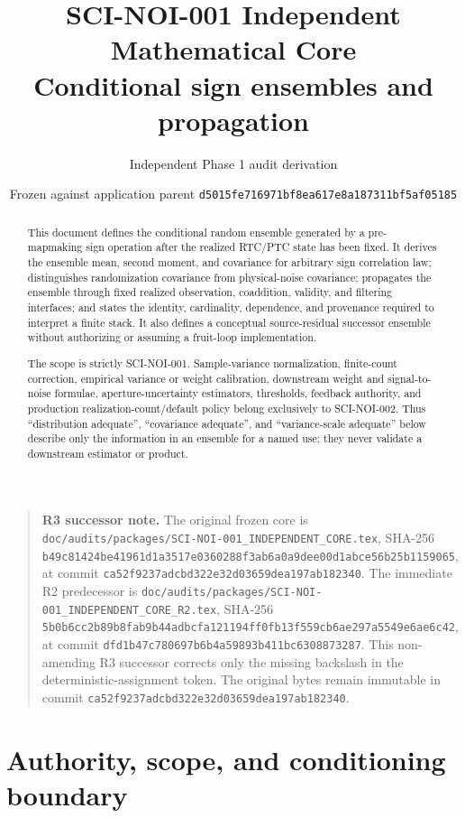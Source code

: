 \documentclass[11pt]{article}
\title{SCI-NOI-001 Independent Mathematical Core\\
Conditional sign ensembles and propagation}
\author{Independent Phase 1 audit derivation}
\date{Frozen against application parent
\texttt{d5015fe716971bf8ea617e8a187311bf5af05185}}
\begin{document}
\maketitle

\begin{quote}
\small
\textbf{R3 successor note.}
The original frozen core is
\texttt{doc/audits/packages/SCI-NOI-001\_INDEPENDENT\_CORE.tex},
SHA-256
\texttt{b49c81424be41961d1a3517e0360288f3ab6a0a9dee00d1abce56b25b1159065},
at commit
\texttt{ca52f9237adcbd322e32d03659dea197ab182340}.
The immediate R2 predecessor is
\texttt{doc/audits/packages/SCI-NOI-001\_INDEPENDENT\_CORE\_R2.tex},
SHA-256
\texttt{5b0b6cc2b89b8fab9b44adbcfa121194ff0fb13f559cb6ae297a5549e6ae6c42},
at commit
\texttt{dfd1b47c780697b6b4a59893b411bc6308873287}.
This non-amending R3 successor corrects only the missing backslash in the
deterministic-assignment \texttt{\string\qquad} token.
The original bytes remain immutable in commit
\texttt{ca52f9237adcbd322e32d03659dea197ab182340}.
\end{quote}

\begin{abstract}
This document defines the conditional random ensemble generated by a
pre-mapmaking sign operation after the realized RTC/PTC state has been fixed.
It derives the ensemble mean, second moment, and covariance for arbitrary sign
correlation law; distinguishes randomization covariance from physical-noise
covariance; propagates the ensemble through fixed realized observation,
coaddition, validity, and filtering interfaces; and states the identity,
cardinality, dependence, and provenance required to interpret a finite stack.
It also defines a conceptual source-residual successor ensemble without
authorizing or assuming a fruit-loop implementation.

The scope is strictly SCI-NOI-001.  Sample-variance normalization, finite-count
correction, empirical variance or weight calibration, downstream weight and
signal-to-noise formulae, aperture-uncertainty estimators, thresholds,
feedback authority, and production realization-count/default policy belong
exclusively to SCI-NOI-002.  Thus ``distribution adequate'', ``covariance
adequate'', and ``variance-scale adequate'' below describe only the information
in an ensemble for a named use; they never validate a downstream estimator or
product.
\end{abstract}

\section{Authority, scope, and conditioning boundary}
\end{document}
